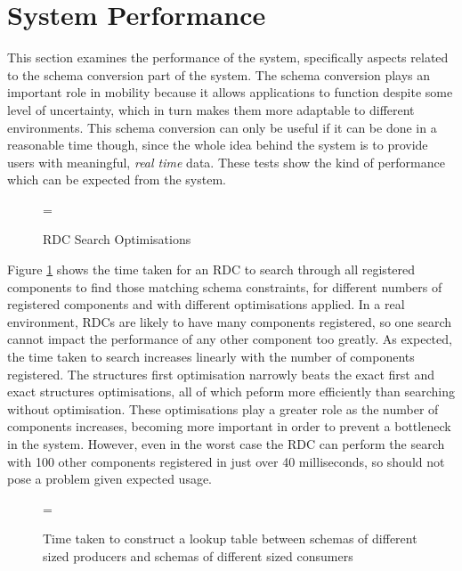\documentclass[12pt,twoside,notitlepage]{report}
\begin{document}
\section{System Performance}

This section examines the performance of the system, specifically aspects related to the schema conversion part of the system. 
The schema conversion plays an important role in mobility because it allows applications to function despite some level of uncertainty, which in turn makes them more adaptable to different environments. 
This schema conversion can only be useful if it can be done in a reasonable time though, since the whole idea behind the system is to provide users with meaningful, {\sl real time} data. 
These tests show the kind of performance which can be expected from the system. 

\begin{figure}[tbh]
\epsfxsize=\hsize
\centerline{}
\caption{RDC Search Optimisations}
\label{fig:rdc_search_optimisations}
\end{figure}

Figure \ref{fig:rdc_search_optimisations} shows the time taken for an RDC to search through all registered components to find those matching schema constraints, for different numbers of registered components and with different optimisations applied. 
In a real environment, RDCs are likely to have many components registered, so one search cannot impact the performance of any other component too greatly.
As expected, the time taken to search increases linearly with the number of components registered. 
The structures first optimisation narrowly beats the exact first and exact structures optimisations, all of which peform more efficiently than searching without optimisation. 
These optimisations play a greater role as the number of components increases, becoming more important in order to prevent a bottleneck in the system. 
However, even in the worst case the RDC can perform the search with 100 other components registered in just over 40 milliseconds, so should not pose a problem given expected usage.

\begin{figure}[tbh]
\epsfxsize=\hsize
\centerline{}
\caption[Construct Lookup Times]{Time taken to construct a lookup table between schemas of different sized producers and schemas of different sized consumers}
\label{fig:construct_lookup}
\end{figure}
\end{document}
